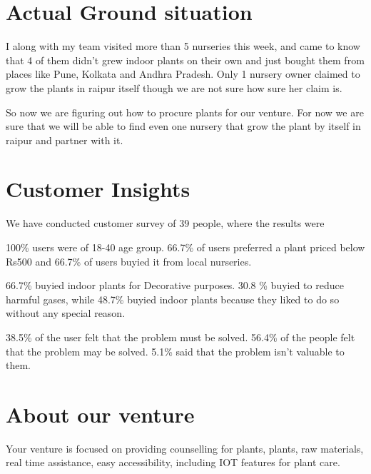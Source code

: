 \documentclass{article}
\begin{document}
\section{Actual Ground situation}

I along with my team visited more than 5 nurseries this week, and came to know that 4 of them didn't grew indoor plants on their own and just bought them from places like Pune, Kolkata and Andhra Pradesh. Only 1 nursery owner claimed to grow the plants in raipur itself though we are not sure how sure her claim is. 

So now we are figuring out how to procure plants for our venture. For now we are sure that we will be able to find even one nursery that grow the plant by itself in raipur and partner with it.


\section{Customer Insights}

We have conducted customer survey of 39 people, where the results were 

100\% users were of 18-40 age group.
66.7\% of users preferred a plant priced below Rs500 and 66.7\% of users buyied it from local nurseries.

66.7\% buyied indoor plants for Decorative purposes. 30.8 \% buyied to reduce harmful gases, while 48.7\% buyied indoor plants because they liked to do so without any special reason.

38.5\% of the user felt that the problem must be solved.
56.4\% of the people felt that the problem may be solved.
5.1\% said that the problem isn't valuable to them.


\section{About our venture}

Your venture is focused on providing counselling for plants, plants, raw materials, real time assistance, easy accessibility, including IOT features for plant care. 
\end{document}
